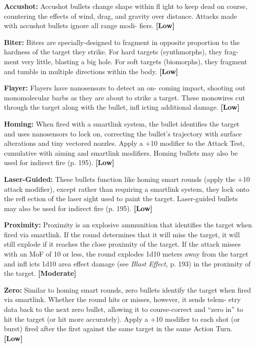 \textbf{Accushot:} Accushot bullets change shape within 
fl ight to keep dead on course, countering the effects 
of wind, drag, and gravity over distance. Attacks 
made with accushot bullets ignore all range modi-
fiers. \textbf{[Low]}

\textbf{Biter:} Biters are specially-designed to fragment in 
opposite proportion to the hardness of the target they 
strike. For hard targets (synthmorphs), they frag-
ment very little, blasting a big hole. For soft targets 
(biomorphs), they fragment and tumble in multiple 
directions within the body. \textbf{[Low]}

\textbf{Flayer:} Flayers have nanosensors to detect an on-
coming impact, shooting out monomolecular barbs 
as they are about to strike a target. These monowires 
cut through the target along with the bullet, infl icting 
additional damage. \textbf{[Low]}

\textbf{Homing:} When fired with a smartlink system, the 
bullet identifies the target and uses nanosensors to 
lock on, correcting the bullet's trajectory with surface 
alterations and tiny vectored nozzles. Apply a +10 
modifier to the Attack Test, cumulative with aiming 
and smartlink modifiers. Homing bullets may also be 
used for indirect fire (p. 195). \textbf{[Low]}

\textbf{Laser-Guided:} These bullets function like homing 
smart rounds (apply the +10 attack modifier), except 
rather than requiring a smartlink system, they lock 
onto the refl ection of the laser sight used to paint 
the target. Laser-guided bullets may also be used for 
indirect fire (p. 195). \textbf{[Low]}

\textbf{Proximity:} Proximity is an explosive ammunition 
that identifies the target when fired via smartlink. If 
the round determines that it will miss the target, it will 
still explode if it reaches the close proximity of the 
target. If the attack misses with an MoF of 10 or less, 
the round explodes 1d10 meters away from the target 
and infl icts 1d10 area effect damage (see \textit{Blast Effect,}
p. 193) in the proximity of the target. \textbf{[Moderate]}

\textbf{Zero:} Similar to homing smart rounds, zero bullets 
identify the target when fired via smartlink. Whether 
the round hits or misses, however, it sends telem-
etry data back to the next zero bullet, allowing it to 
course-correct and ``zero in'' to hit the target (or hit 
more accurately). Apply a +10 modifier to each shot 
(or burst) fired after the first against the same target in 
the same Action Turn. \textbf{[Low]}

